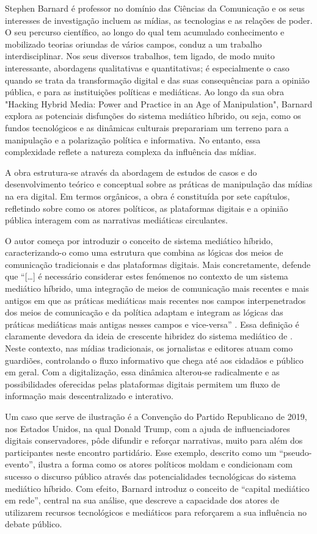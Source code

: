 \documentclass[portuguese]{textolivre}
\begin{document}
Stephen Barnard é professor no domínio das Ciências da Comunicação e os seus interesses de investigação incluem as mídias, as tecnologias e as relações de poder. O seu percurso científico, ao longo do qual tem acumulado conhecimento e mobilizado teorias oriundas de vários campos, conduz a um trabalho interdisciplinar. Nos seus diversos trabalhos, tem ligado, de modo muito interessante, abordagens qualitativas e quantitativas; é especialmente o caso quando se trata da transformação digital e das suas consequências para a opinião pública, e para as instituições políticas e mediáticas. Ao longo da sua obra "Hacking Hybrid Media: Power and Practice in an Age of Manipulation", Barnard explora as potenciais disfunções do sistema mediático híbrido, ou seja, como os fundos tecnológicos e as dinâmicas culturais preparariam um terreno para a manipulação e a polarização política e informativa. No entanto, essa complexidade reflete a natureza complexa da influência das mídias. 

A obra estrutura-se através da abordagem de estudos de casos e do desenvolvimento teórico e conceptual sobre as práticas de manipulação das mídias na era digital. Em termos orgânicos, a obra é constituída por sete capítulos, refletindo sobre como os atores políticos, as plataformas digitais e a opinião pública interagem com as narrativas mediáticas circulantes.

O autor começa por introduzir o conceito de sistema mediático híbrido, caracterizando-o como uma estrutura que combina as lógicas dos meios de comunicação tradicionais e das plataformas digitais. Mais concretamente, defende que “[…] é necessário considerar estes fenómenos no contexto de um sistema mediático híbrido, uma integração de meios de comunicação mais recentes e mais antigos em que as práticas mediáticas mais recentes nos campos interpenetrados dos meios de comunicação e da política adaptam e integram as lógicas das práticas mediáticas mais antigas nesses campos e vice-versa” \cite[p. 17 tradução nossa]{barnard2024}. Essa definição é claramente devedora da ideia de crescente hibridez do sistema mediático de \textcite{chadwick2017}. Neste contexto, nas mídias tradicionais, os jornalistas e editores atuam como guardiões, controlando o fluxo informativo que chega até aos cidadãos e público em geral. Com a digitalização, essa dinâmica alterou-se radicalmente e as possibilidades oferecidas pelas plataformas digitais permitem um fluxo de informação mais descentralizado e interativo.

Um caso que serve de ilustração é a Convenção do Partido Republicano de 2019, nos Estados
Unidos, na qual Donald Trump, com a ajuda de influenciadores digitais conservadores, pôde
difundir e reforçar narrativas, muito para além dos participantes neste encontro partidário. Esse exemplo, descrito como um “pseudo-evento”, ilustra a forma como os atores políticos moldam e condicionam com sucesso o discurso público através das potencialidades tecnológicas do sistema mediático híbrido. Com efeito, Barnard introduz o conceito de “capital mediático em rede”, central na sua análise, que descreve a capacidade dos atores de utilizarem recursos tecnológicos e mediáticos para reforçarem a sua influência no debate público.
\end{document}
